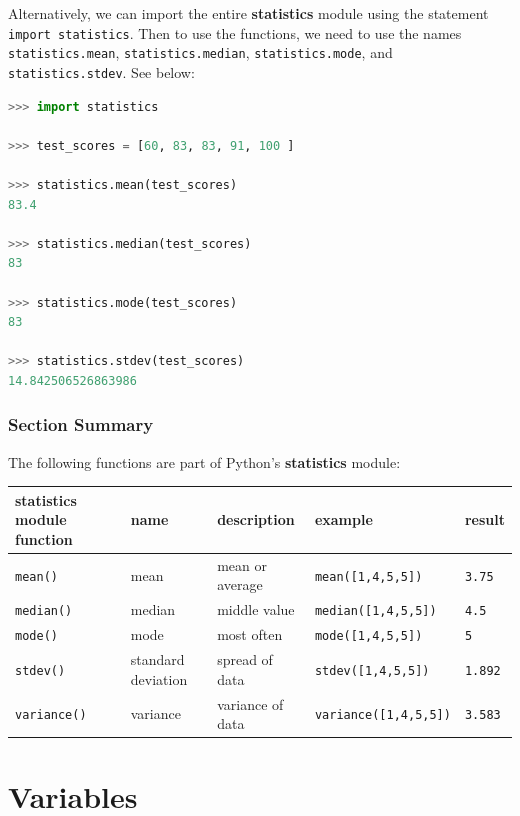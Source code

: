 \documentclass{book}
\begin{document}
Alternatively, we can import the entire \textbf{statistics} module using
the statement \lstinline!import statistics!. Then to use the functions,
we need to use the names \lstinline!statistics.mean!,
\lstinline!statistics.median!, \lstinline!statistics.mode!, and
\lstinline!statistics.stdev!. See below:

\begin{lstlisting}[language=Python]
>>> import statistics
    
>>> test_scores = [60, 83, 83, 91, 100 ]
    
>>> statistics.mean(test_scores)
83.4

>>> statistics.median(test_scores)
83

>>> statistics.mode(test_scores)
83
    
>>> statistics.stdev(test_scores)
14.842506526863986 
\end{lstlisting}
    




    
        \subsubsection{Section Summary}\label{section-summary}

The following functions are part of Python's \textbf{statistics} module:

\begin{longtable}[]{@{}lllll@{}}
\toprule
statistics module function & name & description & example &
result\tabularnewline
\midrule
\endhead
\lstinline!mean()! & mean & mean or average &
\lstinline!mean([1,4,5,5])! & \lstinline!3.75!\tabularnewline
\lstinline!median()! & median & middle value &
\lstinline!median([1,4,5,5])! & \lstinline!4.5!\tabularnewline
\lstinline!mode()! & mode & most often & \lstinline!mode([1,4,5,5])! &
\lstinline!5!\tabularnewline
\lstinline!stdev()! & standard deviation & spread of data &
\lstinline!stdev([1,4,5,5])! & \lstinline!1.892!\tabularnewline
\lstinline!variance()! & variance & variance of data &
\lstinline!variance([1,4,5,5])! & \lstinline!3.583!\tabularnewline
\bottomrule
\end{longtable}
    




    
        \section{Variables}\label{variables}
    
\end{document}
